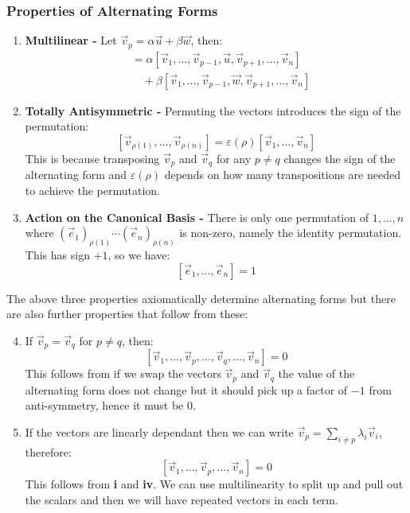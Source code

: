 \documentclass[../main.tex]{subfiles}
\begin{document}
\subsubsection{Properties of Alternating Forms}
\begin{enumerate}
  \item \textbf{Multilinear -} Let $\vec{v}_p = \alpha \vec{u} + \beta \vec{w}$, then:
    \begin{align*}
    [\vec{v}_1, \ldots, \vec{v}_{p - 1}, \alpha \vec{u} + \beta \vec{w}, \vec{v}_{p + 1}, \ldots, \vec{v}_n] &= \alpha [\vec{v}_1, \ldots, \vec{v}_{p - 1}, \vec{u}, \vec{v}_{p + 1}, \ldots, \vec{v}_n]\\ &\quad+ \beta [\vec{v}_1, \ldots, \vec{v}_{p - 1}, \vec{w}, \vec{v}_{p + 1}, \ldots, \vec{v}_n]
    \end{align*}
  \item \textbf{Totally Antisymmetric -} Permuting the vectors introduces the sign of the permutation:
    \[
      [\vec{v}_{\rho(1)}, \ldots, \vec{v}_{\rho(n)}] = \varepsilon(\rho)[\vec{v}_1, \ldots, \vec{v}_n]
    \]
    This is because transposing $\vec{v}_p$ and $\vec{v}_q$ for any $p \neq q$ changes the sign of the alternating form and $\varepsilon(\rho)$ depends on how many transpositions are needed to achieve the permutation.
  \item \textbf{Action on the Canonical Basis -} There is only one permutation of $1, \ldots, n$ where $(\vec{e}_1)_{\rho(1)} \cdots (\vec{e}_n)_{\rho(n)}$ is non-zero, namely the identity permutation.
    This has sign $+1$, so we have:
    \[
      [\vec{e}_1, \ldots, \vec{e}_n] = 1
    \]
\end{enumerate}
The above three properties axiomatically determine alternating forms but there are also further properties that follow from these:
\begin{enumerate}
  \setcounter{enumi}{3}
  \item If $\vec{v}_p = \vec{v}_q$ for $p \neq q$, then:
    \[
      [\vec{v}_1, \ldots, \vec{v}_p, \ldots, \vec{v}_q, \ldots, \vec{v}_n] = 0
    \]
    This follows from if we swap the vectors $\vec{v}_p$ and $\vec{v}_q$ the value of the alternating form does not change but it should pick up a factor of $-1$ from anti-symmetry, hence it must be 0.
  \item If the vectors are linearly dependant then we can write $\vec{v}_p = \sum_{i \neq p} \lambda_i \vec{v}_i$, therefore:
    \[
      [\vec{v}_1, \ldots, \vec{v}_p, \ldots, \vec{v}_n] = 0
    \]
    This follows from \textbf{i} and \textbf{iv}.
    We can use multilinearity to split up and pull out the scalars and then we will have repeated vectors in each term.
\end{enumerate}
\end{document}
